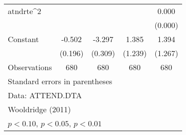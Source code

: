 \begin{table}[htbp]
\begin{tabular}{l*{4}{c}}
\addlinespace
atndrte^2           &                     &                     &                     &       0.000         \\
                    &                     &                     &                     &     (0.000)         \\
\addlinespace
Constant            &      -0.502\sym{**} &      -3.297\sym{***}&       1.385         &       1.394         \\
                    &     (0.196)         &     (0.309)         &     (1.239)         &     (1.267)         \\
\midrule
Observations        &         680         &         680         &         680         &         680         \\
\bottomrule
\multicolumn{5}{l}{\footnotesize Standard errors in parentheses}\\
\multicolumn{5}{l}{\footnotesize Data: ATTEND.DTA}\\
\multicolumn{5}{l}{\footnotesize Wooldridge (2011)}\\
\multicolumn{5}{l}{\footnotesize \sym{*} \(p<0.10\), \sym{**} \(p<0.05\), \sym{***} \(p<0.01\)}\\
\end{tabular}
\end{table}
